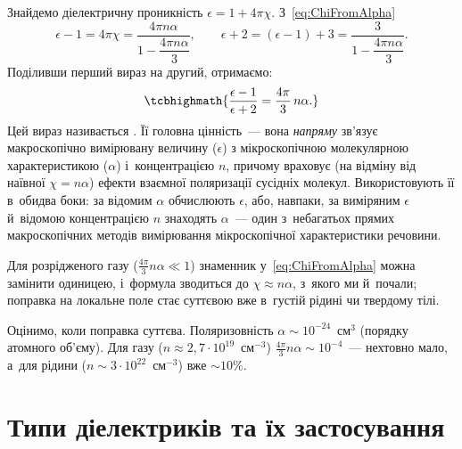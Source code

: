 Знайдемо діелектричну проникність $\epsilon = 1+4\pi\chi$. З~\eqref{eq:ChiFromAlpha}
\begin{equation*}
	\epsilon - 1 = 4\pi\chi = \frac{4\pi n\alpha}{1 - \dfrac{4\pi n\alpha}{3}}, \qquad
	\epsilon + 2 = (\epsilon - 1) + 3 = \frac{3}{1 - \dfrac{4\pi n\alpha}{3}}.
\end{equation*}
Поділивши перший вираз на другий, отримаємо:
\begin{equation}\label{eq:ClausiusMossotti}
	\tcbhighmath{
		\frac{\epsilon - 1}{\epsilon + 2} = \frac{4\pi}{3}\, n\alpha.
	}
\end{equation}
Цей вираз називається . Її головна цінність~--- вона \emph{напряму} зв'язує макроскопічно вимірювану
величину ($\epsilon$) з мікроскопічною молекулярною характеристикою ($\alpha$)
і~концентрацією $n$, причому враховує (на відміну від наївної $\chi = n\alpha$) ефекти
взаємної поляризації сусідніх молекул. Використовують її в~обидва боки: за відомим
$\alpha$ обчислюють $\epsilon$, або, навпаки, за виміряним $\epsilon$ й~відомою
концентрацією $n$ знаходять $\alpha$~--- один з~небагатьох прямих макроскопічних методів
вимірювання мікроскопічної характеристики речовини.

Для розрідженого газу ($\frac{4\pi}{3}n\alpha\ll1$) знаменник у~\eqref{eq:ChiFromAlpha}
можна замінити одиницею, і~формула зводиться до $\chi\approx n\alpha$, з~якого ми
й~почали; поправка на локальне поле стає суттєвою вже в~густій рідині чи твердому тілі.

Оцінимо, коли поправка суттєва. Поляризовність $\alpha \sim 10^{-24}$~см$^3$ (порядку
атомного об'єму). Для газу ($n\approx2{,}7\cdot10^{19}$~см$^{-3}$)
$\frac{4\pi}{3}n\alpha\sim10^{-4}$~--- нехтовно мало, а~для рідини ($n\sim3\cdot10^{22}$~см$^{-3}$)
вже $\sim10\%$.


\section{Типи діелектриків та їх застосування}\hypertarget{dielectric-types-applications}{}


